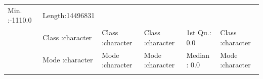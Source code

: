\documentclass[]{article}
\begin{document}
\begin{longtable}[]{@{}llllll@{}}
\begin{minipage}[t]{0.15\columnwidth}
Min. :-1110.0\strut
\end{minipage} & \begin{minipage}[t]{0.16\columnwidth}\raggedright\strut
Length:14496831\strut
\end{minipage}\tabularnewline
\begin{minipage}[t]{0.04\columnwidth}\raggedright\strut
\strut
\end{minipage} & \begin{minipage}[t]{0.16\columnwidth}\raggedright\strut
Class :character\strut
\end{minipage} & \begin{minipage}[t]{0.16\columnwidth}\raggedright\strut
Class :character\strut
\end{minipage} & \begin{minipage}[t]{0.16\columnwidth}\raggedright\strut
Class :character\strut
\end{minipage} & \begin{minipage}[t]{0.15\columnwidth}\raggedright\strut
1st Qu.: 0.0\strut
\end{minipage} & \begin{minipage}[t]{0.16\columnwidth}\raggedright\strut
Class :character\strut
\end{minipage}\tabularnewline
\begin{minipage}[t]{0.04\columnwidth}\raggedright\strut
\strut
\end{minipage} & \begin{minipage}[t]{0.16\columnwidth}\raggedright\strut
Mode :character\strut
\end{minipage} & \begin{minipage}[t]{0.16\columnwidth}\raggedright\strut
Mode :character\strut
\end{minipage} & \begin{minipage}[t]{0.16\columnwidth}\raggedright\strut
Mode :character\strut
\end{minipage} & \begin{minipage}[t]{0.15\columnwidth}\raggedright\strut
Median : 0.0\strut
\end{minipage} & \begin{minipage}[t]{0.16\columnwidth}\raggedright\strut
Mode :character\strut
\end{minipage}\tabularnewline
\begin{minipage}[t]{0.04\columnwidth}\raggedright\strut
\strut
\end{minipage} & \begin{minipage}[t]{0.16\columnwidth}\raggedright\strut

\end{minipage}
\end{longtable}
\end{document}

